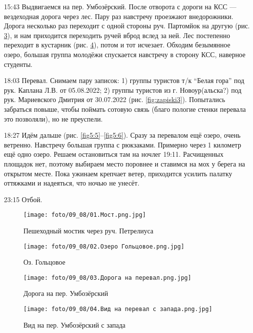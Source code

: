 15:43 Выдвигаемся на пер. Умбозёрский. После отворота с дороги на КСС --- вездеходная дорога через лес.
Пару раз навстречу проезжают внедорожники. Дорога несколько раз переходит с одной стороны руч. Партомйок на другую
(рис. \ref{fig5:3}),
и нам приходится переходить ручей вброд вслед за ней. Лес постепенно переходит в кустарник (рис. \ref{fig5:4}),
потом и тот исчезает.
Обходим безымянное озеро, большая группа молодёжи спускается навстречу в сторону КСС, наверное студенты.

18:03 Перевал. Снимаем пару записок: 1) группы туристов т/к \enquote{Белая гора} под рук. Каплана Л.В. от 05.08.2022;
2) группы туристов из г. Новоур(альска?) под рук. Мариевского Дмитрия от 30.07.2022 (рис. \ref{fig:zapiski3}).
Попытались забраться повыше, чтобы поймать сотовую связь (благо пологие стенки перевала это позволяли), но не преуспели.

18:27 Идём дальше (рис. \ref{fig5:5}--\ref{fig5:6}). Сразу за перевалом ещё озеро, очень ветренно. Навстречу большая группа
с рюкзаками.  Примерно через 1 километр ещё одно озеро. Решаем остановиться там на ночлег 19:11.
Расчищенных площадок нет, поэтому выбираем место поровнее и ставимся на мох у берега на открытом месте.
Пока ужинаем крепчает ветер, приходится усилить палатку оттяжками и надеяться, что ночью не унесёт.

23:15 Отбой.

\begin{figure}
    \centering
    \texttt{[image: foto/09\_08/01.Мост.png.jpg]}
    \caption{Пешеходный мостик через руч. Петрелиуса}
    \label{fig5:1}
\end{figure}

\begin{figure}
    \centering
    \texttt{[image: foto/09\_08/02.Озеро Гольцовое.png.jpg]}
    \caption{Оз. Гольцовое}
    \label{fig5:2}
\end{figure}

\begin{figure}
    \centering
    \texttt{[image: foto/09\_08/03.Дорога на перевал.png.jpg]}
    \caption{Дорога на пер. Умбозёрский}
    \label{fig5:3}
\end{figure}

\begin{figure}
    \centering
    \texttt{[image: foto/09\_08/04.Вид на перевал с запада.png.jpg]}
    \caption{Вид на пер. Умбозёрский с запада}
    \label{fig5:4}
\end{figure}

